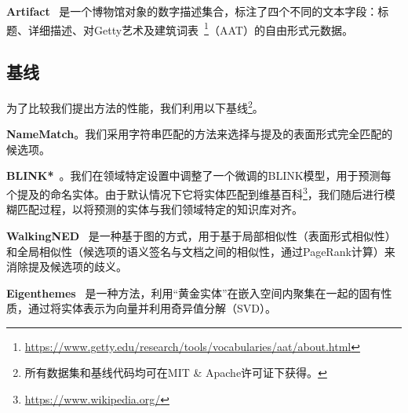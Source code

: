\documentclass[11pt]{article}
\begin{document}
\noindent
\textbf{Artifact}~\cite{CadavidSnchez2023EvaluatingEE} 是一个博物馆对象的数字描述集合，标注了四个不同的文本字段：标题、详细描述、对Getty艺术及建筑词表~\footnote{\url{https://www.getty.edu/research/tools/vocabularies/aat/about.html}}（AAT）的自由形式元数据。
\subsection{基线}
为了比较我们提出方法的性能，我们利用以下基线\footnote{所有数据集和基线代码均可在MIT \& Apache许可证下获得。}。

\noindent
\textbf{NameMatch}\cite{klie2020zero}。我们采用字符串匹配的方法来选择与提及的表面形式完全匹配的候选项。

\noindent
\textbf{BLINK*}~\cite{wu2019zero}。我们在领域特定设置中调整了一个微调的BLINK模型，用于预测每个提及的命名实体。由于默认情况下它将实体匹配到维基百科\footnote{\url{https://www.wikipedia.org/}}，我们随后进行模糊匹配过程，以将预测的实体与我们领域特定的知识库对齐。

\noindent
\textbf{WalkingNED}~\cite{guo2018robust} 是一种基于图的方式，用于基于局部相似性（表面形式相似性）和全局相似性（候选项的语义签名与文档之间的相似性，通过PageRank计算）来消除提及候选项的歧义。

\noindent
\textbf{Eigenthemes}~\cite{arora2021low} 是一种方法，利用“黄金实体”在嵌入空间内聚集在一起的固有性质，通过将实体表示为向量并利用奇异值分解（SVD）。 
\end{document}
